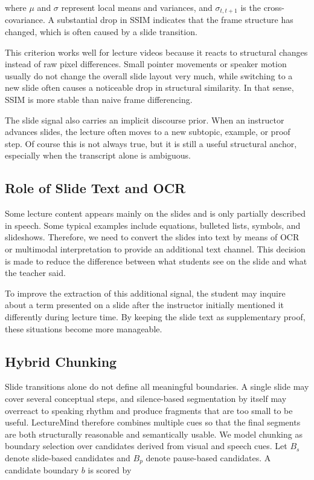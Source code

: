 where $\mu$ and $\sigma$ represent local means and variances, and $\sigma_{t,t+1}$ is the cross-covariance. A substantial drop in SSIM indicates that the frame structure has changed, which is often caused by a slide transition.

This criterion works well for lecture videos because it reacts to structural changes instead of raw pixel differences. Small pointer movements or speaker motion usually do not change the overall slide layout very much, while switching to a new slide often causes a noticeable drop in structural similarity. In that sense, SSIM is more stable than naive frame differencing.

The slide signal also carries an implicit discourse prior. When an instructor advances slides, the lecture often moves to a new subtopic, example, or proof step. Of course this is not always true, but it is still a useful structural anchor, especially when the transcript alone is ambiguous.

\subsection{Role of Slide Text and OCR}

Some lecture content appears mainly on the slides and is only partially described in speech. Some typical examples include equations, bulleted lists, symbols, and slideshows. Therefore, we need to convert the slides into text by means of OCR or multimodal interpretation to provide an additional text channel. This decision is made to reduce the difference between what students see on the slide and what the teacher said.

To improve the extraction of this additional signal, the student may inquire about a term presented on a slide after the instructor initially mentioned it differently during lecture time. By keeping the slide text as supplementary proof, these situations become more manageable.

\subsection{Hybrid Chunking}

Slide transitions alone do not define all meaningful boundaries. A single slide may cover several conceptual steps, and silence-based segmentation by itself may overreact to speaking rhythm and produce fragments that are too small to be useful. LectureMind therefore combines multiple cues so that the final segments are both structurally reasonable and semantically usable. We model chunking as boundary selection over candidates derived from visual and speech cues. Let $B_s$ denote slide-based candidates and $B_p$ denote pause-based candidates. A candidate boundary $b$ is scored by

